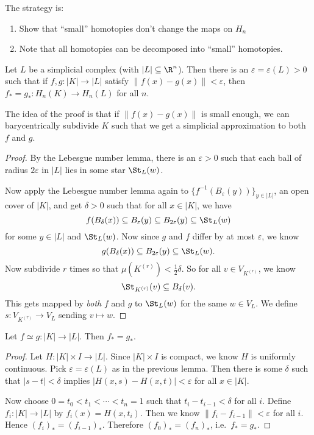 \documentclass[a4paper]{article}
\begin{document}
The strategy is:
\begin{enumerate}
  \item Show that ``small'' homotopies don't change the maps on $H_n$
  \item Note that all homotopies can be decomposed into ``small'' homotopies.
\end{enumerate}

\begin{lemma}
  Let $L$ be a simplicial complex (with $|L| \subseteq \R^n$). Then there is an $\varepsilon = \varepsilon(L) > 0$ such that if $f, g: |K| \to |L|$ satisfy $\|f(x) - g(x)\| < \varepsilon$, then $f_* = g_*: H_n(K) \to H_n(L)$ for all $n$.
\end{lemma}
The idea of the proof is that if $\|f(x) - g(x)\|$ is small enough, we can barycentrically subdivide $K$ such that we get a simplicial approximation to both $f$ and $g$.
\begin{proof}
  By the Lebesgue number lemma, there is an $\varepsilon > 0$ such that each ball of radius $2\varepsilon$ in $|L|$ lies in some star $\St_L(w)$.

  Now apply the Lebesgue number lemma again to $\{f^{-1}(B_\varepsilon(y))\}_{y \in |L|}$, an open cover of $|K|$, and get $\delta > 0$ such that for all $x \in |K|$, we have
  \[
    f(B_\delta(x)) \subseteq B_\varepsilon(y) \subseteq B_{2\varepsilon}(y) \subseteq \St_L(w)
  \]
  for some $y \in |L|$ and $\St_L(w)$. Now since $g$ and $f$ differ by at most $\varepsilon$, we know
  \[
    g(B_\delta(x)) \subseteq B_{2\varepsilon}(y) \subseteq \St_L(w).
  \]
  Now subdivide $r$ times so that $\mu(K^{(r)}) < \frac{1}{2} \delta$. So for all $v \in V_{K^(r)}$, we know
  \[
    \St_{K^{(r)}} (v) \subseteq B_\delta(v).
  \]
  This gets mapped by \emph{both} $f$ and $g$ to $\St_L(w)$ for the same $w \in V_L$. We define $s: V_{K^{(r)}} \to V_L$ sending $v \mapsto w$.
\end{proof}

\begin{thm}
  Let $f\simeq g: |K| \to |L|$. Then $f_* = g_*$.
\end{thm}

\begin{proof}
  Let $H: |K| \times I \to |L|$. Since $|K|\times I$ is compact, we know $H$ is uniformly continuous. Pick $\varepsilon = \varepsilon(L)$ as in the previous lemma. Then there is some $\delta$ such that $|s - t| < \delta$ implies $|H(x, s) - H(x, t)| < \varepsilon$ for all $x \in |K|$.

  Now choose $0 = t_0 < t_1 < \cdots < t_n = 1$ such that $t_i - t_{i - 1} < \delta$ for all $i$. Define $f_i: |K| \to |L|$ by $f_i(x) = H(x, t_i)$. Then we know $\|f_i - f_{i - 1}\| < \varepsilon$ for all $i$. Hence $(f_i)_* = (f_{i - 1})_*$. Therefore $(f_0)_* = (f_n)_*$, i.e.\ $f_* = g_*$.
\end{proof}
\end{document}
